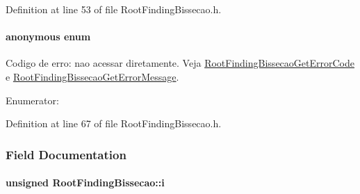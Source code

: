 Definition at line 53 of file RootFindingBissecao.h.\hypertarget{structRootFindingBissecao_6a58c7139b830307aaf62ffa2e9175d9}{
\paragraph["@3]{\setlength{\rightskip}{0pt plus 5cm}anonymous enum}\hfill}
\label{structRootFindingBissecao_6a58c7139b830307aaf62ffa2e9175d9}


Codigo de erro: nao acessar diretamente. Veja \hyperlink{group____bissecao_g9672d1ca4387db1792f8219968118900}{RootFindingBissecaoGetErrorCode} e \hyperlink{group____bissecao_g77e94d3a9b5999461aabeca3bfe1837a}{RootFindingBissecaoGetErrorMessage}. 

\begin{Desc}
\item[Enumerator: ]\par
\begin{description}
\item[{\em 
\hypertarget{structRootFindingBissecao_6a58c7139b830307aaf62ffa2e9175d99e3115571687e8ab7da7a5553becb6ec}{
BISSECAO\_\-NO\_\-ERROR}
\label{structRootFindingBissecao_6a58c7139b830307aaf62ffa2e9175d99e3115571687e8ab7da7a5553becb6ec}
}]\item[{\em 
\hypertarget{structRootFindingBissecao_6a58c7139b830307aaf62ffa2e9175d9d6103abe4afb484b65910b31e7f537c2}{
BISSECAO\_\-X\_\-ISINF\_\-OR\_\-ISNAN\_\-ERROR}
\label{structRootFindingBissecao_6a58c7139b830307aaf62ffa2e9175d9d6103abe4afb484b65910b31e7f537c2}
}]\end{description}
\end{Desc}



Definition at line 67 of file RootFindingBissecao.h.

\subsubsection{Field Documentation}
\hypertarget{structRootFindingBissecao_d6eeba6745ed7dc5d390846473c9b817}{
\paragraph[i]{\setlength{\rightskip}{0pt plus 5cm}unsigned {\bf RootFindingBissecao::i}}\hfill}
\label{structRootFindingBissecao_d6eeba6745ed7dc5d390846473c9b817}




